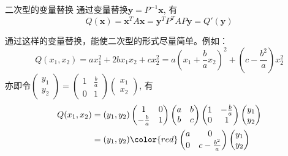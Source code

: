 
\begin{frame}

\begin{block}{二次型的变量替换}
通过变量替换$\mathbf{y} = P^{-1}\mathbf{x}$, 有
\[Q(\mathbf{x}) = \mathbf{x}^T A \mathbf{x} = \mathbf{y}^T P^TAP \mathbf{y} = Q'(\mathbf{y})\]

\pause

通过这样的变量替换，能使二次型的形式尽量简单。例如：
\begin{displaymath}
Q(x_1,x_2) = ax_1^2 + 2bx_1x_2 + cx_2^2 = a\left( x_1 + \dfrac{b}{a}x_2 \right)^2 + \left( c - \dfrac{b^2}{a} \right) x_2^2
\end{displaymath}
亦即令\(\displaystyle \begin{pmatrix} y_1 \\ y_2 \end{pmatrix} = \begin{pmatrix} 1 & \frac{b}{a} \\ 0 & 1 \end{pmatrix} \begin{pmatrix} x_1 \\ x_2 \end{pmatrix}\), 有
\begin{align*}
Q(x_1,x_2) & = (y_1,y_2) \begin{pmatrix} 1 & 0 \\ -\frac{b}{a} & 1 \end{pmatrix} \begin{pmatrix} a & b \\ b & c \end{pmatrix} \begin{pmatrix} 1 & -\frac{b}{a} \\ 0 & 1 \end{pmatrix} \begin{pmatrix} y_1 \\ y_2 \end{pmatrix} \\
& = (y_1,y_2) {\color{red} \begin{pmatrix} a & 0 \\ 0 & c - \frac{b^2}{a} \end{pmatrix}} \begin{pmatrix} y_1 \\ y_2 \end{pmatrix}
\end{align*}
\end{block}

\end{frame}

